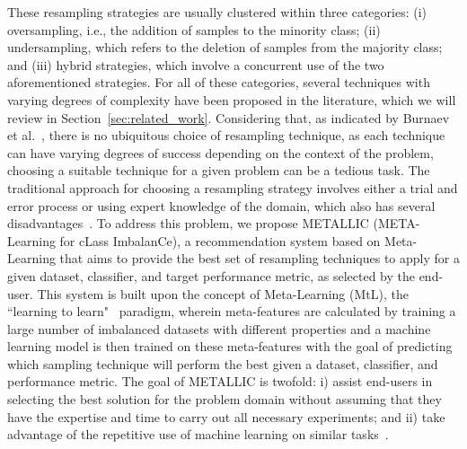 \documentclass{article}
\begin{document}
These resampling strategies are usually clustered within three categories: (i) oversampling, i.e., the addition of samples to the minority class; (ii) undersampling, which refers to the deletion of samples from the majority class; and (iii) hybrid strategies, which involve a concurrent use of the two aforementioned strategies. For all of these categories, several techniques with varying degrees of complexity have been proposed in the literature, which we will review in Section~\autoref{sec:related_work}. Considering that, as indicated by Burnaev et al.~\cite{burnaevInfluenceResamplingAccuracy2015}, there is no ubiquitous choice of resampling technique, as each technique can have varying degrees of success depending on the context of the problem, choosing a suitable technique for a given problem can be a tedious task. The traditional approach for choosing a resampling strategy involves either a trial and error process or using expert knowledge of the domain, which also has several disadvantages~\cite{wangImprovedMethodsClassification2015}. To address this problem, we propose METALLIC (META-Learning for cLass ImbalanCe), a recommendation system based on Meta-Learning that aims to provide the best set of resampling techniques to apply for a given dataset, classifier, and target performance metric, as selected by the end-user. This system is built upon the concept of Meta-Learning (MtL), the ``learning to learn"~\cite{schmidhuberEvolutionaryPrinciplesSelfreferential1987} paradigm, wherein meta-features are calculated by training a large number of imbalanced datasets with different properties and a machine learning model is then trained on these meta-features with the goal of predicting which sampling technique will perform the best given a dataset, classifier, and performance metric. The goal of METALLIC is twofold: i) assist end-users in selecting the best solution for the problem domain without assuming that they have the expertise and time to carry out all necessary experiments; and ii) take advantage of the repetitive use of machine learning on similar tasks~\cite{brazdilMetalearningApplicationsData2008}.
\end{document}
